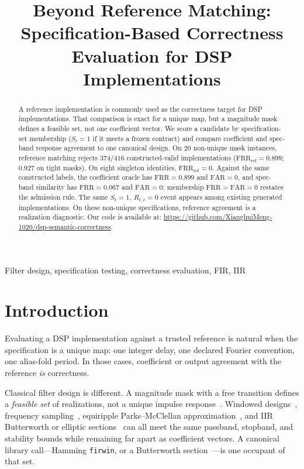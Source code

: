 \documentclass{article}
\title{Beyond Reference Matching: Specification-Based Correctness\\
Evaluation for DSP Implementations}
\begin{document}
\maketitle

\begin{abstract}
A reference implementation is commonly used as the correctness target
for DSP implementations.
That comparison is exact for a unique map, but a magnitude mask
defines a feasible set, not one coefficient vector.
We score a candidate by specification-set membership ($S_t=1$ if it
meets a frozen contract) and compare coefficient and spec-band
response agreement to one canonical design.
On 20 non-unique mask instances, reference matching rejects
$374/416$ constructed-valid implementations
($\mathrm{FRR}_{\mathrm{ref}}=0.899$; $0.927$ on tight masks).
On eight singleton identities, $\mathrm{FRR}_{\mathrm{ref}}=0$.
Against the same constructed labels, the coefficient oracle has
$\mathrm{FRR}=0.899$ and $\mathrm{FAR}=0$, and spec-band similarity
has $\mathrm{FRR}=0.067$ and $\mathrm{FAR}=0$; membership
$\mathrm{FRR}=\mathrm{FAR}=0$ restates the admission rule.
The same $S_t=1$, $R_{t,r}=0$ event appears among existing generated
implementations.
On these non-unique specifications, reference agreement is a
realization diagnostic.
Our code is available at:
\url{https://github.com/XianghuiMeng-1020/dsp-semantic-correctness}.
\end{abstract}

\begin{keywords}
Filter design, specification testing, correctness evaluation, FIR, IIR
\end{keywords}

\section{Introduction}
\label{sec:intro}

Evaluating a DSP implementation against a trusted reference is natural
when the specification is a unique map: one integer delay, one declared
Fourier convention, one alias-fold period.
In those cases, coefficient or output agreement with the reference
\emph{is} correctness.

Classical filter design is different.
A magnitude mask with a free transition defines a
\emph{feasible set} of realizations, not a unique impulse
response~\cite{oppenheim2010dsp,proakis2007dsp,mitra2011dsp,rabiner1975theory}.
Windowed designs~\cite{kaiser1974window,harris1978windows},
frequency sampling~\cite{rabiner1970freqsamp},
equiripple Parks--McClellan approximation~\cite{parks1972chebyshev,mcclellan1973computer,rabiner1975fir},
and IIR Butterworth or elliptic sections~\cite{butterworth1930,constantinides1970,jackson1996filters,antoniou2006filters}
can all meet the same passband, stopband, and stability bounds while
remaining far apart as coefficient vectors.
A canonical library call---Hamming \texttt{firwin}, or a Butterworth
section~\cite{virtanen2020scipy}---is one occupant of that set.
\end{document}
